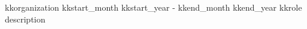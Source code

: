     \resumeSubHeadingListStart
      \resumeSubheading
      { kkorganization }{ kkstart_month kkstart_year - kkend_month kkend_year }
      { kkrole }{}
      \resumeItemListStart
        description
      \resumeItemListEnd
    \resumeSubHeadingListEnd

